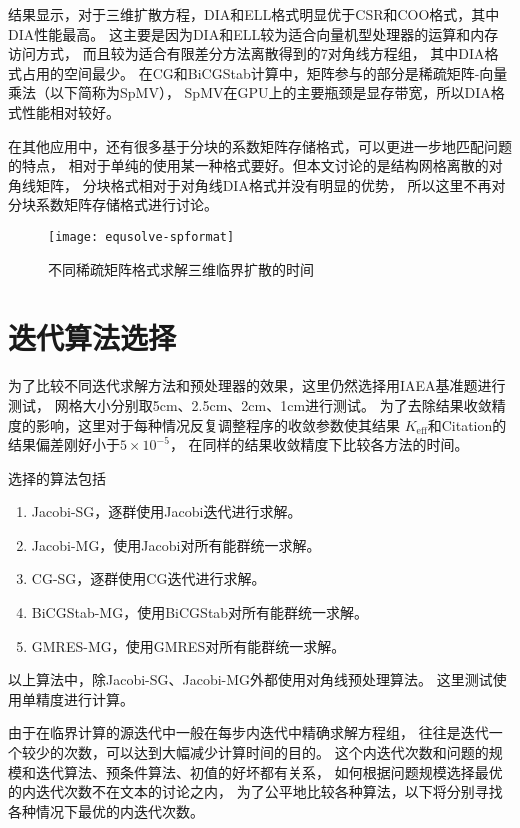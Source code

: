 结果显示，对于三维扩散方程，DIA和ELL格式明显优于CSR和COO格式，其中DIA性能最高。
这主要是因为DIA和ELL较为适合向量机型处理器的运算和内存访问方式，
而且较为适合有限差分方法离散得到的7对角线方程组，
其中DIA格式占用的空间最少。
在CG和BiCGStab计算中，矩阵参与的部分是稀疏矩阵-向量乘法（以下简称为SpMV），
SpMV在GPU上的主要瓶颈是显存带宽\cite{bell2008spmv,
baskaran2008optimizing}，所以DIA格式性能相对较好。

在其他应用中，还有很多基于分块的系数矩阵存储格式，可以更进一步地匹配问题的特点，
相对于单纯的使用某一种格式要好。但本文讨论的是结构网格离散的对角线矩阵，
分块格式相对于对角线DIA格式并没有明显的优势，
所以这里不再对分块系数矩阵存储格式进行讨论。



\begin{figure}
\centering
\texttt{[image: equsolve-spformat]}
\caption{\label{fig:equsolve.spformat}不同稀疏矩阵格式求解三维临界扩散的时间}
\end{figure}


\section{迭代算法选择}

为了比较不同迭代求解方法和预处理器的效果，这里仍然选择用IAEA基准题进行测试，
网格大小分别取5cm、2.5cm、2cm、1cm进行测试。
为了去除结果收敛精度的影响，这里对于每种情况反复调整程序的收敛参数使其结果
$K_\mathrm{eff}$和Citation的结果偏差刚好小于$5\times10^{-5}$，
在同样的结果收敛精度下比较各方法的时间。

选择的算法包括
\begin{enumerate}
\item Jacobi-SG，逐群使用Jacobi迭代进行求解。
\item Jacobi-MG，使用Jacobi对所有能群统一求解。
\item CG-SG，逐群使用CG迭代进行求解。
\item BiCGStab-MG，使用BiCGStab对所有能群统一求解。
\item GMRES-MG，使用GMRES对所有能群统一求解。
\end{enumerate}
以上算法中，除Jacobi-SG、Jacobi-MG外都使用对角线预处理算法。
这里测试使用单精度进行计算。

由于在临界计算的源迭代中一般在每步内迭代中精确求解方程组，
往往是迭代一个较少的次数，可以达到大幅减少计算时间的目的。
这个内迭代次数和问题的规模和迭代算法、预条件算法、初值的好坏都有关系，
如何根据问题规模选择最优的内迭代次数不在文本的讨论之内，
为了公平地比较各种算法，以下将分别寻找各种情况下最优的内迭代次数。

